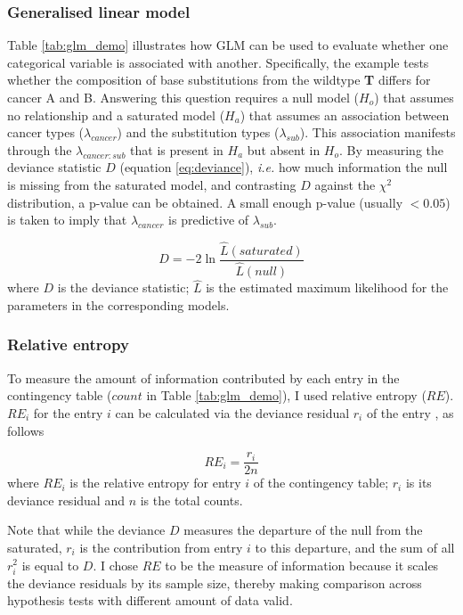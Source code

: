 \subsubsection{Generalised linear model}
Table \ref{tab:glm_demo} illustrates how GLM can be used to evaluate whether one categorical variable is associated with another. Specifically, the example tests whether the composition of base substitutions from the wildtype \textbf{T} differs for cancer A and B. Answering this question requires a null model ($H_o$) that assumes no relationship and a saturated model ($H_a$) that assumes an association between cancer types ($\lambda_{cancer}$) and the substitution types ($\lambda_{sub}$). This association manifests through the $\lambda_{cancer:sub}$ that is present in $H_a$ but absent in $H_o$. By measuring the deviance statistic $D$ (equation \ref{eq:deviance}), \textit{i.e.} how much information the null is missing from the saturated model, and contrasting $D$ against the $\chi^2$ distribution, a p-value can be obtained. A small enough p-value (usually $<0.05$) is taken to imply that $\lambda_{cancer}$ is predictive of $\lambda_{sub}$.

\begin{equation}
D = -2 \ln \frac{\hat{L}(saturated)}{\hat{L}(null)}
\label{eq:deviance}
\end{equation}
where $D$ is the deviance statistic; $\hat{L}$ is the estimated maximum likelihood for the parameters in the corresponding models.



\subsubsection{Relative entropy}\label{methods:re}
To measure the amount of information contributed by each entry in the contingency table ($count$ in Table \ref{tab:glm_demo}), I used relative entropy ($RE$). $RE_i$ for the entry $i$ can be calculated via the deviance residual $r_i$ of the entry \citep[$r_i$ obtained using appendix equation \ref{eq:dev_res};][]{Zhu2017}, as follows

\begin{equation}
    RE_i = \frac{r_i}{2n} 
    \label{eq:re}
\end{equation}
where $RE_i$ is the relative entropy for entry $i$ of the contingency table; $r_i$ is its deviance residual and $n$ is the total counts. 

Note that while the deviance $D$ measures the departure of the null from the saturated, $r_i$ is the contribution from entry $i$ to this departure, and the sum of all $r_i^2$ is equal to $D$. I chose $RE$ to be the measure of information because it scales the deviance residuals by its sample size, thereby making comparison across hypothesis tests with different amount of data valid. 

